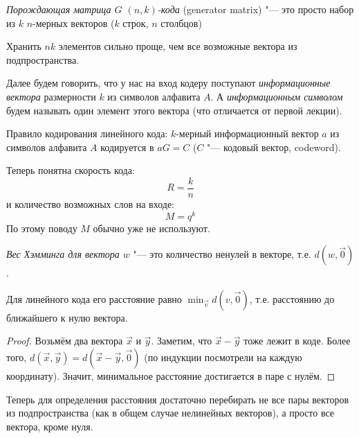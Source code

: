 \begin{Def}
	\textit{Порождающая матрица $G$ $(n, k)$-кода} (generator matrix) "---
	это просто набор из $k$ $n$-мерных векторов ($k$ строк, $n$ столбцов)
\end{Def}
\begin{Rem}
	Хранить $nk$ элементов сильно проще, чем все возможные вектора из
	подпространства.
\end{Rem}

\begin{Rem}
	Далее будем говорить, что у нас на вход кодеру поступают \textit{информационные вектора}
	размерности $k$ из символов алфавита $A$.
	А \textit{информационным символом} будем называть один элемент этого вектора (что отличается от первой лекции).
\end{Rem}
\begin{Def}
	Правило кодирования линейного кода:
	$k$-мерный информационный вектор $a$ из символов алфавита $A$
	кодируется в $aG=C$ ($C$ "--- кодовый вектор, codeword).
\end{Def}
\begin{Rem}
	Теперь понятна скорость кода:
	\[
		R = \frac{k}{n}
	\]
	и количество возможных слов на входе:
	\[
		M = q^k
	\]
	По этому поводу $M$ обычно уже не используют.
\end{Rem}

\begin{Def}
	\textit{Вес Хэмминга для вектора $w$} "--- это количество ненулей в векторе,
	т.е. $d(w, \vec 0)$.
\end{Def}
\begin{lemma}
	Для линейного кода его расстояние равно $\min_{\vec v} d(v, \vec 0)$,
	т.е. расстоянию до ближайшего к нулю вектора.
\end{lemma}
\begin{proof}
	Возьмём два вектора $\vec x$ и $\vec y$.
	Заметим, что $\vec x - \vec y$ тоже лежит в коде.
	Более того, $d(\vec x, \vec y) = d(\vec x - \vec y, \vec 0)$
	(по индукции посмотрели на каждую координату).
	Значит, минимальное расстояние достигается в паре с нулём.
\end{proof}
\begin{Rem}
	Теперь для определения расстояния достаточно перебирать
	не все пары векторов из подпространства (как в общем случае нелинейных векторов),
	а просто все вектора, кроме нуля.
\end{Rem}

